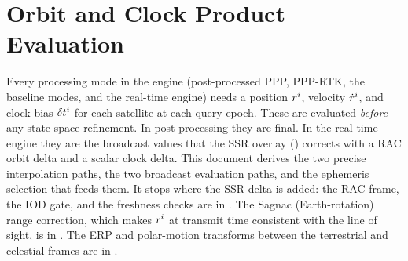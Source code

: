 \documentclass[main.tex]{subfiles}
\begin{document}
\section{Orbit and Clock Product Evaluation}\label{sec:products}

\newcommand{\eciframe}{\bm{r}^{\sat}_{\mathrm{I}}}     %
\newcommand{\rotz}[1]{\bm{R}_z(#1)}                    %
\newcommand{\earthrot}{\omega_{\oplus}}               %
\newcommand{\sidereal}{\kappa}                         %
\newcommand{\trigfreq}{\Omega_{0}}                     %
\newcommand{\satclk}{\delta t^{\sat}}                 %
\newcommand{\eccanom}{E}                              %
\newcommand{\meananom}{M}                             %
\newcommand{\trueanom}{\nu}                           %
\newcommand{\meanmotion}{n}                           %
\newcommand{\jtwo}{J_2}                               %

Every processing mode in the engine (post-processed PPP, PPP-RTK, the
baseline modes, and the real-time engine) needs a position $r^{i}$,
velocity $\dot{r}^{i}$, and clock bias $\satclk$ for each satellite at each
query epoch.  These are evaluated \emph{before} any state-space
refinement.  In post-processing they are final.  In the real-time engine
they are the broadcast values that the SSR overlay
() corrects with a RAC
orbit delta and a scalar clock delta.  This document derives the two
precise interpolation paths, the two broadcast evaluation paths, and the
ephemeris selection that feeds them.  It stops where the SSR delta is
added: the RAC frame, the IOD gate, and the freshness checks are in
.  The Sagnac (Earth-rotation) range
correction, which makes $r^{i}$ at transmit time consistent with the
line of sight, is in .  The ERP and polar-motion transforms between the terrestrial
and celestial frames are in .
\end{document}
